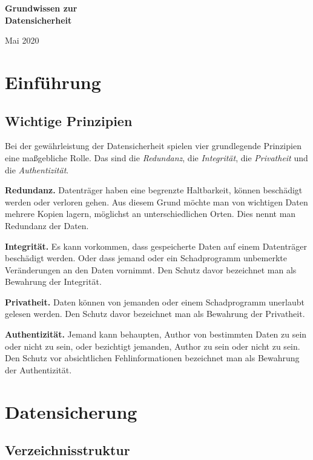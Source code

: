 \documentclass[a4paper,11pt,fleqn,twocolumn,twoside]{scrartcl}
\newcommand{\strong}[1]{\textsf{\textbf{#1}}}
\begin{document}
\thispagestyle{empty}

\noindent
{\LARGE\sffamily\bfseries
Grundwissen zur\\
Datensicherheit\par}

\vspace{1em}\noindent
Mai 2020

\tableofcontents

\section{Einführung}
\subsection{Wichtige Prinzipien}

Bei der gewährleistung der Datensicherheit spielen
vier grundlegende Prinzipien eine maßgebliche Rolle.
Das sind die \emph{Redundanz},
die \emph{Integrität}, die \emph{Privatheit} und die
\emph{Authentizität}.

\strong{Redundanz.}
Datenträger haben eine begrenzte Haltbarkeit, können beschädigt werden
oder verloren gehen. Aus diesem Grund möchte man von wichtigen Daten
mehrere Kopien lagern, möglichst an unterschiedlichen Orten.
Dies nennt man Redundanz der Daten.

\strong{Integrität.}
Es kann vorkommen, dass gespeicherte Daten auf einem Datenträger
beschädigt werden. Oder dass jemand oder ein Schadprogramm
unbemerkte Veränderungen an den Daten vornimmt. Den Schutz davor
bezeichnet man als Bewahrung der Integrität.

\strong{Privatheit.}
Daten können von jemanden oder einem Schadprogramm unerlaubt
gelesen werden. Den Schutz davor bezeichnet man als
Bewahrung der Privatheit.

\strong{Authentizität.}
Jemand kann behaupten, Author von bestimmten Daten zu sein
oder nicht zu sein, oder bezichtigt jemanden, Author zu sein
oder nicht zu sein. Den Schutz vor absichtlichen Fehlinformationen
bezeichnet man als Bewahrung der Authentizität.

\section{Datensicherung}
\subsection{Verzeichnisstruktur}
\end{document}

